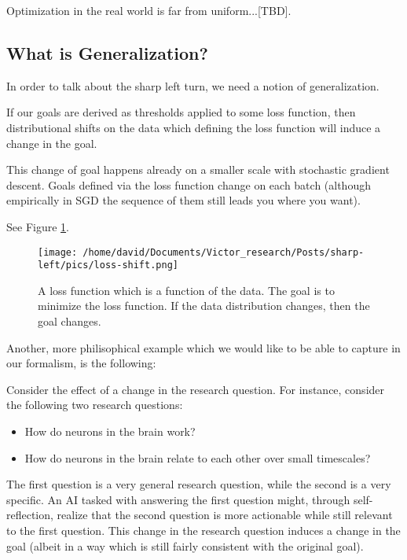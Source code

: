 \documentclass{article}
\begin{document}
Optimization in the real world is far from uniform...[TBD].

\subsection{What is Generalization?}
In order to talk about the sharp left turn, we need a notion of generalization.

\begin{example}
If our goals are derived as thresholds applied to some loss function, then distributional shifts on the data which defining the loss function will induce a change in the goal.

This change of goal happens already on a smaller scale with stochastic gradient descent. Goals defined via the loss function change on each batch (although empirically in SGD the sequence of them still leads you where you want).

See Figure \ref{fig:loss-shift}.
\end{example}

\begin{figure}[ht]
    \centering
    \texttt{[image: /home/david/Documents/Victor\_research/Posts/sharp-left/pics/loss-shift.png]} 
    \caption{A loss function which is a function of the data. The goal is to minimize the loss function. If the data distribution changes, then the goal changes.}
    \label{fig:loss-shift} 
\end{figure}

Another, more philisophical example which we would like to be able to capture in our formalism, is the following:

\begin{example}
    Consider the effect of a change in the research question. For instance, consider the following two research questions: 
    \begin{itemize}
        \item How do neurons in the brain work?
        \item How do neurons in the brain relate to each other over small timescales?
    \end{itemize}
    The first question is a very general research question, while the second is a very specific. An AI tasked with answering the first question might, through self-reflection, realize that the second question is more actionable while still relevant to the first question. This change in the research question induces a change in the goal (albeit in a way which is still fairly consistent with the original goal).
\end{example}
\end{document}
